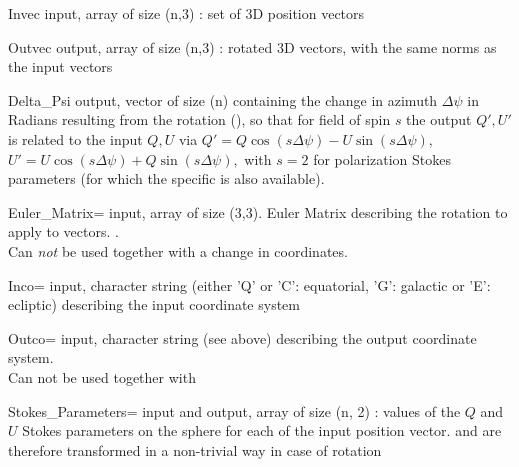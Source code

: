 \begin{qualifiers}
  \begin{qulist}{} %
%
    \item[Invec] 
      input,  array of size (n,3) : set of 3D position vectors
%
    \item[Outvec] 
     output, array of size (n,3) : rotated 3D vectors, with the same norms as the input vectors
% 
   \item[Delta\_Psi]
       output, vector of size (n) containing the change in azimuth $\Delta\psi$ in Radians
	resulting from the rotation 
       (),
        so that for field of spin $s$ the output $Q',U'$ is related to the input $Q,U$ via
                  $Q' = Q \cos (s\Delta\psi)  -  U \sin (s\Delta\psi),\ $
                  $U' = U \cos (s\Delta\psi)  +  Q \sin (s\Delta\psi), $
       with $s=2$ for polarization Stokes parameters 
(for which the specific  is also available).
%
   \item[Euler\_Matrix=] 
       input, array of size (3,3). Euler Matrix
       describing the rotation to apply to vectors.
       .\\
       Can \emph{not} be used together with a change in coordinates.
%
    \item[Inco=] 
       input, character string (either 'Q' or 'C': equatorial,
    'G': galactic or 'E': ecliptic) describing the input coordinate system 
%
    \item[Outco=] 
        input, character string (see above) describing the output
          coordinate system.\\
    Can not be used together with 
%
    \item[Stokes\_Parameters=]
       input and output, array of size (n, 2) :
      values of the $Q$ and $U$ Stokes parameters on the sphere for each of
      the input position vector.  and are therefore transformed in a
      non-trivial way in case of rotation
%
%
  \end{qulist}
\end{qualifiers}

